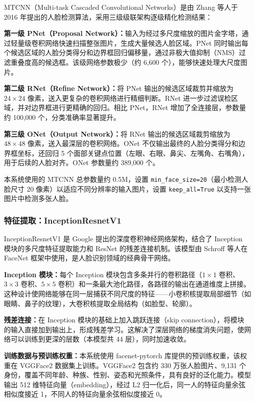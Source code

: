 \documentclass[12pt, a4paper]{article}
\begin{document}
MTCNN（Multi-task Cascaded Convolutional Networks）是由 Zhang 等人\cite{zhang2016mtcnn}于 2016 年提出的人脸检测算法，采用三级级联架构逐级精化检测结果：

\textbf{第一级 PNet（Proposal Network）：}输入为经过多尺度缩放的图片金字塔，通过轻量级卷积网络快速扫描整张图片，生成大量候选人脸区域。PNet 同时输出每个候选区域的人脸分类得分和边界框回归偏移量，通过非极大值抑制（NMS）过滤重叠度高的候选框。该级网络参数极少（约 6,600 个），能够快速处理大尺度图片。

\textbf{第二级 RNet（Refine Network）：}将 PNet 输出的候选区域裁剪并缩放为 $24 \times 24$ 像素，送入更复杂的卷积网络进行精细判断。RNet 进一步过滤误检区域，并对边界框进行更精确的回归。相比 PNet，RNet 增加了全连接层，参数量约 100,000 个，分类准确率显著提升。

\textbf{第三级 ONet（Output Network）：}将 RNet 输出的候选区域裁剪缩放为 $48 \times 48$ 像素，送入最深层的卷积网络。ONet 不仅输出最终的人脸分类得分和边界框坐标，还回归 5 个面部关键点位置（左眼、右眼、鼻尖、左嘴角、右嘴角），用于后续的人脸对齐。ONet 参数量约 389,000 个。

本系统使用的 MTCNN 总参数量约 0.5M，设置 \texttt{min\_face\_size=20}（最小检测人脸尺寸 20 像素）以适应不同分辨率的输入图片，设置 \texttt{keep\_all=True} 以支持一张图片中检测多张人脸。

\subsubsection{特征提取：InceptionResnetV1}

InceptionResnetV1 是 Google 提出的深度卷积神经网络架构，结合了 Inception 模块的多尺度特征提取能力和 ResNet 的残差连接机制。该模型由 Schroff 等人\cite{schroff2015facenet}在 FaceNet 框架中使用，是人脸识别领域的经典骨干网络。

\textbf{Inception 模块：}每个 Inception 模块包含多条并行的卷积路径（$1\times1$ 卷积、$3\times3$ 卷积、$5\times5$ 卷积）和一条最大池化路径，各路径的输出在通道维度上拼接。这种设计使网络能够在同一层捕获不同尺度的特征——小卷积核提取局部细节（如眼睛、鼻子的纹理），大卷积核提取全局结构（如脸型、轮廓）。

\textbf{残差连接：}在 Inception 模块的基础上加入跳跃连接（skip connection），将模块的输入直接加到输出上，形成残差学习。这解决了深层网络的梯度消失问题，使网络可以训练到更深的层数（本模型共 44 层），同时加速收敛。

\textbf{训练数据与预训练权重：}本系统使用 facenet-pytorch 库提供的预训练权重，该权重在 VGGFace2 数据集\cite{cao2018vggface2}上训练。VGGFace2 包含约 330 万张人脸图片、9,131 个身份，覆盖不同年龄、种族、性别、姿态和光照条件，具有良好的泛化能力。模型输出 512 维特征向量（embedding），经过 L2 归一化后，同一人的特征向量余弦相似度接近 1，不同人的特征向量余弦相似度接近 0。
\end{document}
